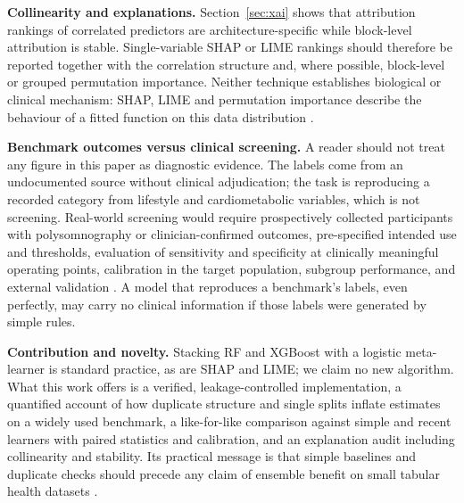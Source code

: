 \documentclass[11pt,a4paper]{article}
\begin{document}
\textbf{Collinearity and explanations.} Section~\ref{sec:xai} shows that attribution rankings of correlated predictors are architecture-specific while block-level attribution is stable. Single-variable SHAP or LIME rankings should therefore be reported together with the correlation structure and, where possible, block-level or grouped permutation importance. Neither technique establishes biological or clinical mechanism: SHAP, LIME and permutation importance describe the behaviour of a fitted function on this data distribution \citep{kumar2020,jung2023}.

\textbf{Benchmark outcomes versus clinical screening.} A reader should not treat any figure in this paper as diagnostic evidence. The labels come from an undocumented source without clinical adjudication; the task is reproducing a recorded category from lifestyle and cardiometabolic variables, which is not screening. Real-world screening would require prospectively collected participants with polysomnography or clinician-confirmed outcomes, pre-specified intended use and thresholds, evaluation of sensitivity and specificity at clinically meaningful operating points, calibration in the target population, subgroup performance, and external validation \citep{collins2024tripod,riley2024,lekadir2025}. A model that reproduces a benchmark's labels, even perfectly, may carry no clinical information if those labels were generated by simple rules.

\textbf{Contribution and novelty.} Stacking RF and XGBoost with a logistic meta-learner is standard practice, as are SHAP and LIME; we claim no new algorithm. What this work offers is a verified, leakage-controlled implementation, a quantified account of how duplicate structure and single splits inflate estimates on a widely used benchmark, a like-for-like comparison against simple and recent learners with paired statistics and calibration, and an explanation audit including collinearity and stability. Its practical message is that simple baselines and duplicate checks should precede any claim of ensemble benefit on small tabular health datasets \citep{rudin2019}.
\end{document}
